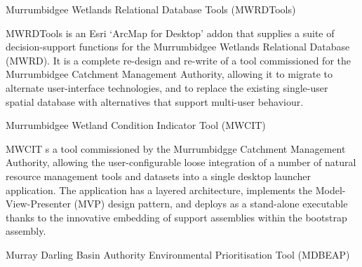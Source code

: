 \documentclass{portfolio}
\begin{document}
\begin{Projects}
\begin{Project}{Murrumbidgee Wetlands Relational Database Tools (MWRDTools)}
      \begin{ProjectOverview}
        MWRDTools is an Esri `ArcMap for Desktop' addon that supplies a suite of decision-support functions for the Murrumbidgee Wetlands Relational Database (MWRD).
        It is a complete re-design and re-write of a tool commissioned for the Murrumbidgee Catchment Management Authority, allowing it to migrate to alternate user-interface
        technologies, and to replace the existing single-user spatial database with alternatives that support multi-user behaviour.
      \end{ProjectOverview}
    \end{Project}
    \begin{Project}{Murrumbidgee Wetland Condition Indicator Tool (MWCIT)}
      \begin{ProjectOverview}
        MWCIT s a tool commissioned by the Murrumbidgge Catchment Management Authority, allowing the user-configurable loose integration
        of a number of natural resource management tools and datasets into a single desktop launcher application. 
        The application has a layered architecture, implements the Model-View-Presenter (MVP) design pattern, and deploys as a stand-alone 
        executable thanks to the innovative embedding of support assemblies within the bootstrap assembly. 
      \end{ProjectOverview}
    \end{Project}
    \begin{Project}{Murray Darling Basin Authority Environmental Prioritisation Tool (MDBEAP)}

\end{Project}
\end{Projects}
\end{document}
